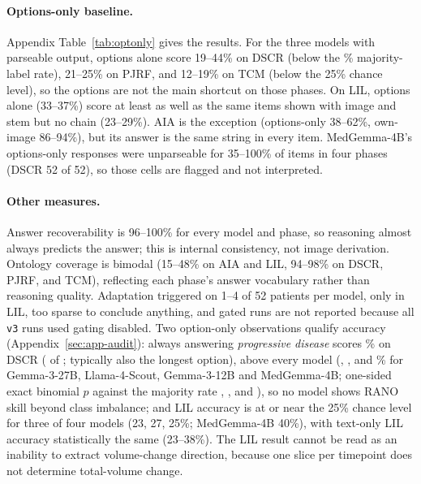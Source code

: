 \documentclass[11pt]{article}
\begin{document}
\paragraph{Options-only baseline.} Appendix Table~\ref{tab:optonly} gives the results. For the three models with parseable output, options alone score 19--44\% on DSCR (below the \dscrMajorityPct{}\% majority-label rate), 21--25\% on PJRF, and 12--19\% on TCM (below the 25\% chance level), so the options are not the main shortcut on those phases. On LIL, options alone (33--37\%) score at least as well as the same items shown with image and stem but no chain (23--29\%). AIA is the exception (options-only 38--62\%, own-image 86--94\%), but its answer is the same string in every item. MedGemma-4B's options-only responses were unparseable for 35--100\% of items in four phases (DSCR 52 of 52), so those cells are flagged and not interpreted.

\paragraph{Other measures.} Answer recoverability is 96--100\% for every model and phase, so reasoning almost always predicts the answer; this is internal consistency, not image derivation. Ontology coverage is bimodal (15--48\% on AIA and LIL, 94--98\% on DSCR, PJRF, and TCM), reflecting each phase's answer vocabulary rather than reasoning quality. Adaptation triggered on 1--4 of 52 patients per model, only in LIL, too sparse to conclude anything, and gated runs are not reported because all \texttt{v3} runs used gating disabled. Two option-only observations qualify accuracy (Appendix~\ref{sec:app-audit}): always answering \emph{progressive disease} scores \dscrMajorityPct{}\% on DSCR (\dscrMajorityCount{} of \nPatVthree{}; typically also the longest option), above every model (\vthreeDscrAccGemmaTwentySeven{}, \vthreeDscrAccScout{}, \vthreeDscrAccGemmaTwelve{} and \vthreeDscrAccMedGemma{}\% for Gemma-3-27B, Llama-4-Scout, Gemma-3-12B and MedGemma-4B; one-sided exact binomial $p$ against the majority rate \vthreeDscrPGemmaTwentySeven{}, \vthreeDscrPScout{}, \vthreeDscrPGemmaTwelve{} and \vthreeDscrPMedGemma{}), so no model shows RANO skill beyond class imbalance; and LIL accuracy is at or near the 25\% chance level for three of four models (23, 27, 25\%; MedGemma-4B 40\%), with text-only LIL accuracy statistically the same (23--38\%). The LIL result cannot be read as an inability to extract volume-change direction, because one slice per timepoint does not determine total-volume change.
\end{document}
